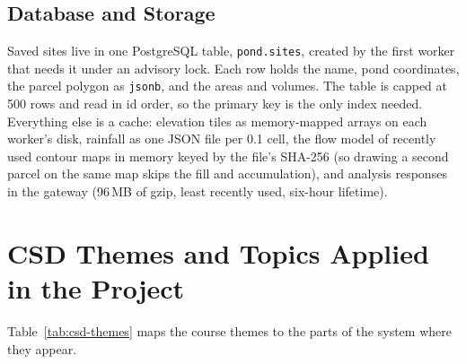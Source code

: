 \documentclass[manuscript,screen,review]{acmart}
\begin{document}
\subsection{Database and Storage}
Saved sites live in one PostgreSQL table, \texttt{pond.sites}, created by the first worker that
needs it under an advisory lock. Each row holds the name, pond coordinates, the parcel polygon as
\texttt{jsonb}, and the areas and volumes. The table is capped at 500 rows and read in id order, so
the primary key is the only index needed. Everything else is a cache: elevation tiles as
memory-mapped arrays on each worker's disk, rainfall as one JSON file per 0.1\textdegree{} cell,
the flow model of recently used contour maps in memory keyed by the file's SHA-256 (so drawing a
second parcel on the same map skips the fill and accumulation), and analysis responses in the
gateway (96\,MB of gzip, least recently used, six-hour lifetime).

\section{CSD Themes and Topics Applied in the Project}
\label{sec:csd-themes}
Table~\ref{tab:csd-themes} maps the course themes to the parts of the system where they appear.
\end{document}
